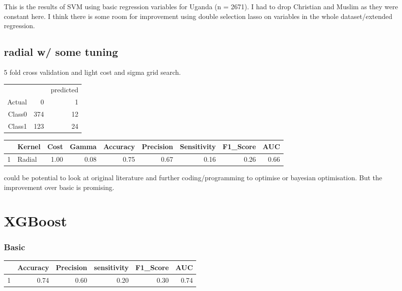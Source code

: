 \documentclass{article}
\begin{document}
This is the results of SVM using basic regression variables for Uganda (n = 2671). I had to drop Christian and Muslim as they were constant here. I think there is some room for improvement using double selection lasso on variables in the whole dataset/extended regression. 

\subsection{radial w/ some tuning}
5 fold cross validation and light cost and sigma grid search. 
\begin{table}[ht]
\centering
\begin{tabular}{rrr}
\hline
& & predicted
  \\Actual
 & 0 & 1 \\ 
  \hline
Class0 & 374 &  12 \\ 
  Class1 & 123 &  24 \\ 
   \hline
\end{tabular}
\end{table}
\begin{table}[ht]
\centering
\begin{tabular}{rlrrrrrrr}
  \hline
 & Kernel & Cost & Gamma & Accuracy & Precision & Sensitivity & F1\_Score & AUC \\ 
  \hline
1 & Radial & 1.00 & 0.08 & 0.75 & 0.67 & 0.16 & 0.26 & 0.66 \\ 
   \hline
\end{tabular}
\end{table}

could be potential to look at original literature and further coding/programming to optimise or bayesian optimisation. But the improvement over basic is promising. 


\newpage
\section{XGBoost}
\subsubsection{Basic}
\begin{table}[ht]
\centering
\begin{tabular}{rrrrrr}
  \hline
 & Accuracy & Precision & sensitivity & F1\_Score & AUC \\ 
  \hline
1 & 0.74 & 0.60 & 0.20 & 0.30 & 0.74 \\ 
   \hline
\end{tabular}
\end{table}
\end{document}
